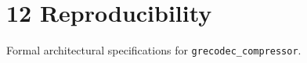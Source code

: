 \section{12 Reproducibility}

Formal architectural specifications for \texttt{grecodec_compressor}.
